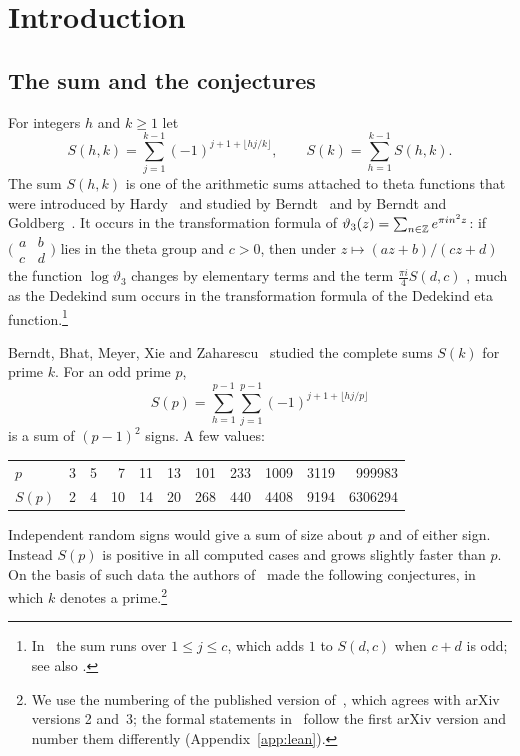\section{Introduction}\label{sec:intro}

\subsection{The sum and the conjectures}
For integers $h$ and $k\ge1$ let
\begin{equation}\label{eq:Shk}
S(h,k)=\sum_{j=1}^{k-1}(-1)^{j+1+\lfloor hj/k\rfloor},\qquad S(k)=\sum_{h=1}^{k-1}S(h,k).
\end{equation}
The sum $S(h,k)$ is one of the arithmetic sums attached to theta functions that were introduced by Hardy~\cite{b14} and studied by Berndt~\cite{b2} and by Berndt and Goldberg~\cite{b3}. It occurs in the transformation formula of $\vartheta_3(z)=\sum_{n\in\mathbb{Z}}e^{\pi in^2z}$: if $\bigl(\begin{smallmatrix}a&b\\c&d\end{smallmatrix}\bigr)$ lies in the theta group and $c>0$, then under $z\mapsto(az+b)/(cz+d)$ the function $\log\vartheta_3$ changes by elementary terms and the term $\frac{\pi i}4S(d,c)$ \cite[Theorem~4.1]{b2}, much as the Dedekind sum occurs in the transformation formula of the Dedekind eta function.\footnote{In~\cite{b2} the sum runs over $1\le j\le c$, which adds $1$ to $S(d,c)$ when $c+d$ is odd; see also \cite[Section~2]{b1}.}

Berndt, Bhat, Meyer, Xie and Zaharescu~\cite{b1} studied the complete sums $S(k)$ for prime $k$. For an odd prime $p$,
\[
S(p)=\sum_{h=1}^{p-1}\sum_{j=1}^{p-1}(-1)^{j+1+\lfloor hj/p\rfloor}
\]
is a sum of $(p-1)^2$ signs. A few values:
\begin{center}\small
\begin{tabular}{l*{10}{r}}
\toprule
$p$ & 3 & 5 & 7 & 11 & 13 & 101 & 233 & 1009 & 3119 & 999983\\
$S(p)$ & 2 & 4 & 10 & 14 & 20 & 268 & 440 & 4408 & 9194 & 6306294\\
\bottomrule
\end{tabular}
\end{center}
Independent random signs would give a sum of size about $p$ and of either sign. Instead $S(p)$ is positive in all computed cases and grows slightly faster than $p$. On the basis of such data the authors of~\cite{b1} made the following conjectures, in which $k$ denotes a prime.\footnote{We use the numbering of the published version of~\cite{b1}, which agrees with arXiv versions 2 and~3; the formal statements in~\cite{b11} follow the first arXiv version and number them differently (Appendix~\ref{app:lean}).}

